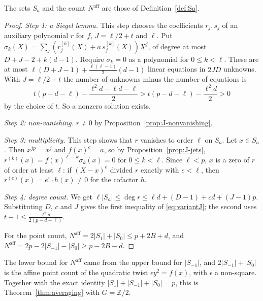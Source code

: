 \documentclass[11pt]{amsbook}
\theoremstyle{plain}
\theoremstyle{definition}
\theoremstyle{remark}
\numberwithin{equation}{section}
\numberwithin{figure}{chapter}
\numberwithin{table}{chapter}
\newcommand{\Z}{\mathbb{Z}}
\begin{document}
The sets $S_a$ and the count $N^{\mathrm{aff}}$ are those of
Definition~\ref{def:Sa}.

\begin{proof}
\emph{Step 1: a Siegel lemma.} This step chooses the coefficients
$r_j,s_j$ of an auxiliary polynomial $r$ for $f$, $J=\ell/2+t$ and
$\ell$. Put
$\sigma_k(X)=\sum_j(r_j^{[k]}(X)+a\,s_j^{[k]}(X))X^j$, of degree at
most $D+J-2+k(d-1)$. Require $\sigma_k=0$ as a polynomial for
$0\le k<\ell$. These are at most
$\ell(D+J-1)+\frac{\ell(\ell-1)}2(d-1)$ linear equations in $2JD$
unknowns. With $J=\ell/2+t$ the number of unknowns minus the number
of equations is
\[
t(p-d-\ell)-\frac{\ell^2d-\ell d-\ell}2
>t(p-d-\ell)-\frac{\ell^2d}2>0
\]
by the choice of $t$. So a nonzero solution exists.

\emph{Step 2: non-vanishing.} $r\ne0$ by
Proposition~\ref{prop:J-nonvanishing}.

\emph{Step 3: multiplicity.} This step shows that $r$ vanishes to
order $\ell$ on $S_a$. Let $x\in S_a$. Then $x^{jp}=x^j$ and
$f(x)^c=a$, so by Proposition~\ref{prop:J-jets},
$r^{(k)}(x)=f(x)^{\ell-k}\sigma_k(x)=0$ for $0\le k<\ell$. Since
$\ell<p$, $x$ is a zero of $r$ of order at least $\ell$: if
$(X-x)^e$ divided $r$ exactly with $e<\ell$, then
$r^{(e)}(x)=e!\cdot h(x)\ne0$ for the cofactor $h$.

\emph{Step 4: degree count.} We get
$\ell\lvert S_a\rvert\le\deg r\le\ell d+(D-1)+cd+(J-1)p$.
Substituting $D$, $c$ and $J$ gives the first inequality of
\eqref{eq:variantJ}; the second uses
$t-1\le\frac{\ell^2d}{2(p-d-\ell)}$.

For the point count,
$N^{\mathrm{aff}}=2\lvert S_1\rvert+\lvert S_0\rvert\le p+2B+d$,
and
$N^{\mathrm{aff}}=2p-2\lvert S_{-1}\rvert-\lvert S_0\rvert
\ge p-2B-d$.
\end{proof}

The lower bound for $N^{\mathrm{aff}}$ came from the upper bound
for $\lvert S_{-1}\rvert$, and
$2\lvert S_{-1}\rvert+\lvert S_0\rvert$ is the affine point count
of the quadratic twist $\epsilon y^2=f(x)$, with $\epsilon$ a
non-square. Together with the exact identity
$\lvert S_1\rvert+\lvert S_{-1}\rvert+\lvert S_0\rvert=p$, this is
Theorem~\ref{thm:averaging} with $G=\Z/2$.
\end{document}
